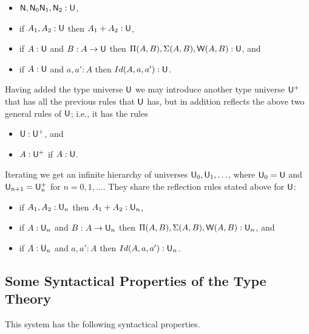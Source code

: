 {\begin{itemize}
\item ${\sf N},{\sf N}_0{\sf N}_1,{\sf N}_2:{\sf U}$,
\item if $A_1,A_2:{\sf U}$ then $A_1+A_2:{\sf U}$,
\item if $A:{\sf U}$ and $B:A\rightarrow{\sf U}$ then     $\Pi(A,B),\Sigma(A,B),{\sf W}(A,B):{\sf U}$, and 
\item if $A:{\sf U}$ and $a,a':A$ then $Id(A,a,a'):{\sf U}$.
\end{itemize}

Having added the type universe ${\sf U}$ we may introduce another type universe
${\sf U}^+$ that has all the previous rules that ${\sf U}$ has, but in addition reflects the above two general rules of ${\sf U}$; i.e., it has the rules

\medskip

\begin{itemize}
\item ${\sf U}:{\sf U}^+$, and
\item $A:{\sf U}^+$ if $A:{\sf U}$.
\end{itemize}

\medskip

Iterating we get an infinite hierarchy of universes ${\sf U}_0,{\sf U}_1,\ldots$, where
${\sf U}_0={\sf U}$ and ${\sf U}_{n+1}={\sf U}_n^+$ for $n=0,1,\ldots$.  They share the reflection rules
stated above for ${\sf U}$:

\begin{itemize}
\item if $A_1,A_2:{\sf U}_n$ then $A_1+A_2:{\sf U}_n$,
\item if $A:{\sf U}_n$ and $B:A\rightarrow{\sf U}_n$ then     $\Pi(A,B),\Sigma(A,B),{\sf W}(A,B):{\sf U}_n$, and 
\item if $A:{\sf U}_n$ and $a,a':A$ then $Id(A,a,a'):{\sf U}_n$.
\end{itemize}


\medskip
\subsection*{Some Syntactical Properties of the Type Theory}
 This system has the following syntactical properties.

}
